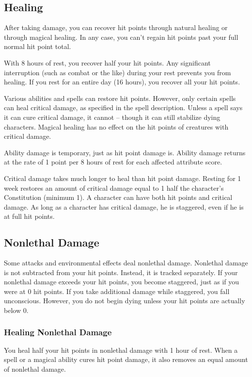 \subsection{Healing}
After taking damage, you can recover hit points through natural healing or through magical healing. In any case, you can't regain hit points past your full normal hit point total.

 With 8 hours of rest, you recover half your hit points. Any significant interruption (such as combat or the like) during your rest prevents you from healing. If you rest for an entire day (16 hours), you recover all your hit points.

 Various abilities and spells can restore hit points. However, only certain spells can heal critical damage, as specified in the spell description. Unless a spell says it can cure critical damage, it cannot -- though it can still stabilize dying characters. Magical healing has no effect on the hit points of creatures with critical damage.

 Ability damage is temporary, just as hit point damage is. Ability damage returns at the rate of 1 point per 8 hours of rest for each affected attribute score.

 Critical damage takes much longer to heal than hit point damage. Resting for 1 week restores an amount of critical damage equal to 1 \add half the character's Constitution (minimum 1). A character can have both hit points and critical damage. As long as a character has critical damage, he is staggered, even if he is at full hit points.

\subsection{Nonlethal Damage}\label{Nonlethal Damage}
Some attacks and environmental effects deal nonlethal damage. Nonlethal damage is not subtracted from your hit points. Instead, it is tracked separately. If your nonlethal damage exceeds your hit points, you become staggered, just as if you were at 0 hit points. If you take additional damage while staggered, you fall unconscious. However, you do not begin dying unless your hit points are actually below 0. 

\subsubsection{Healing Nonlethal Damage}
You heal half your hit points in nonlethal damage with 1 hour of rest. When a spell or a magical ability cures hit point damage, it also removes an equal amount of nonlethal damage.

